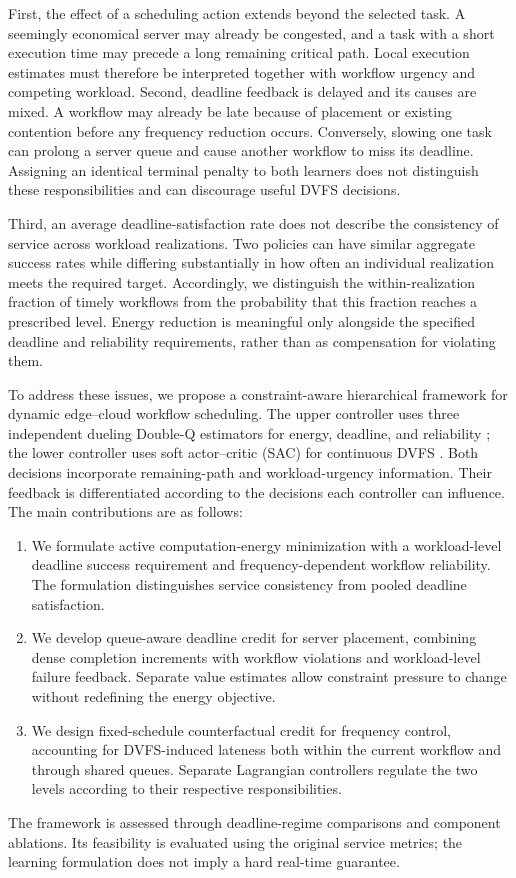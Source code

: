 \documentclass[lettersize,journal]{IEEEtran}
\begin{document}
First, the effect of a scheduling action extends beyond the selected
task. A seemingly economical server may already be congested, and a
task with a short execution time may precede a long remaining critical
path. Local execution estimates must therefore be interpreted together
with workflow urgency and competing workload. Second, deadline feedback
is delayed and its causes are mixed. A workflow may already be late
because of placement or existing contention before any frequency
reduction occurs. Conversely, slowing one task can prolong a server
queue and cause another workflow to miss its deadline. Assigning an
identical terminal penalty to both learners does not distinguish these
responsibilities and can discourage useful DVFS decisions.

Third, an average deadline-satisfaction rate does not describe the
consistency of service across workload realizations. Two policies can
have similar aggregate success rates while differing substantially in
how often an individual realization meets the required target.
Accordingly, we distinguish the within-realization fraction of timely
workflows from the probability that this fraction reaches a prescribed
level. Energy reduction is meaningful only alongside the specified
deadline and reliability requirements, rather than as compensation for
violating them.

To address these issues, we propose a constraint-aware hierarchical
framework for dynamic edge--cloud workflow scheduling. The upper
controller uses three independent dueling Double-Q estimators for energy,
deadline, and reliability \cite{vanhasselt2016,wang2016dueling}; the lower
controller uses soft actor--critic (SAC) for continuous DVFS
\cite{haarnoja2018}. Both decisions incorporate remaining-path and
workload-urgency information. Their feedback is differentiated according
to the decisions each controller can influence. The main contributions
are as follows:
\begin{enumerate}
 \item We formulate active computation-energy minimization with a
 workload-level deadline success requirement and frequency-dependent
 workflow reliability. The formulation distinguishes service consistency
 from pooled deadline satisfaction.
 \item We develop queue-aware deadline credit for server placement,
 combining dense completion increments with workflow violations and
 workload-level failure feedback. Separate value estimates allow
 constraint pressure to change without redefining the energy objective.
 \item We design fixed-schedule counterfactual credit for frequency
 control, accounting for DVFS-induced lateness both within the current
 workflow and through shared queues. Separate Lagrangian controllers
 regulate the two levels according to their respective responsibilities.
\end{enumerate}
The framework is assessed through deadline-regime comparisons and
component ablations. Its feasibility is evaluated using the original
service metrics; the learning formulation does not imply a hard
real-time guarantee.
\end{document}
